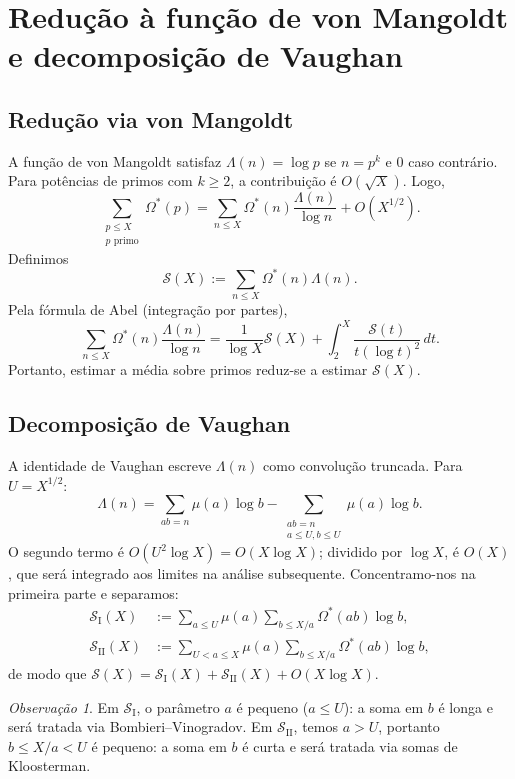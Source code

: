 \documentclass[12pt]{article}
\theoremstyle{definition}
\theoremstyle{remark}
\newtheorem{observacao}[teorema]{Observação}
\newcommand{\Omstar}{\Omega^*}
\newcommand{\SI}{\mathcal{S}_{\mathrm{I}}}
\newcommand{\SII}{\mathcal{S}_{\mathrm{II}}}
\newcommand{\Sc}{\mathcal{S}}
\begin{document}
	\section{Redução à função de von Mangoldt e decomposição de Vaughan}
	\label{sec:mangoldt}
	
	\subsection{Redução via von Mangoldt}
	
	A função de von Mangoldt satisfaz $\Lambda(n)=\log p$ se $n=p^k$ e $0$
	caso contrário.
	Para potências de primos com $k\ge2$, a contribuição é
	$O(\sqrt{X})$. Logo,
	\[
	\sum_{\substack{p\le X\\ p\text{ primo}}}\Omstar(p)
	=\sum_{n\le X}\Omstar(n)\frac{\Lambda(n)}{\log n}+O\!\left(X^{1/2}\right).
	\]
	Definimos
	\[
	\Sc(X):=\sum_{n\le X}\Omstar(n)\Lambda(n).
	\]
	Pela fórmula de Abel (integração por partes),
	\[
	\sum_{n\le X}\Omstar(n)\frac{\Lambda(n)}{\log n}
	=\frac{1}{\log X}\Sc(X)+\int_{2}^{X}\frac{\Sc(t)}{t(\log t)^2}\,dt.
	\]
	Portanto, estimar a média sobre primos reduz-se a estimar $\Sc(X)$.
	
	\subsection{Decomposição de Vaughan}
	
	A identidade de Vaughan \cite[Lema 2.1]{vaughan} escreve $\Lambda(n)$
	como convolução truncada. Para $U=X^{1/2}$:
	\[
	\Lambda(n)=\sum_{ab=n}\mu(a)\log b-\sum_{\substack{ab=n\\ a\le U,b\le U}}\mu(a)\log b.
	\]
	O segundo termo é $O(U^2\log X)=O(X\log X)$; dividido por $\log X$, é
	$O(X)$, que será integrado aos limites na análise subsequente.
	Concentramo-nos na primeira parte e separamos:
	\begin{align*}
		\SI(X) &:=\sum_{a\le U}\mu(a)\sum_{b\le X/a}\Omstar(ab)\log b,\\
		\SII(X) &:=\sum_{U<a\le X}\mu(a)\sum_{b\le X/a}\Omstar(ab)\log b,
	\end{align*}
	de modo que $\Sc(X)=\SI(X)+\SII(X)+O(X\log X)$.
	
	\begin{observacao}
		Em $\SI$, o parâmetro $a$ é pequeno ($a\le U$): a soma em $b$ é longa e
		será tratada via Bombieri–Vinogradov.
		Em $\SII$, temos $a>U$, portanto
		$b\le X/a<U$ é pequeno: a soma em $b$ é curta e será tratada via somas
		de Kloosterman.
	\end{observacao}
	
\end{document}
